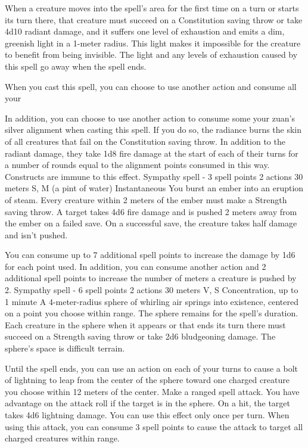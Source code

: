     When a creature moves into the spell's area for the first time on a turn or starts its turn there, that creature must succeed on a Constitution saving throw or take 4d10 radiant damage, and it suffers one level of exhaustion and emits a dim, greenish light in a 1-meter radius.
    This light makes it impossible for the creature to benefit from being invisible.
    The light and any levels of exhaustion caused by this spell go away when the spell ends.

    When you cast this spell, you can choose to use another action and consume all your

    In addition, you can choose to use another action to consume some your zuan's silver alignment when casting this spell.
    If you do so, the radiance burns the skin of all creatures that fail on the Constitution saving throw.
    In addition to the radiant damage, they take 1d8 fire damage at the start of each of their turns for a number of rounds equal to the alignment points consumed in this way.
    Constructs are immune to this effect.
    {Sympathy spell - 3 spell points}
    {2 actions}
    {30 meters}
    {S, M (a pint of water)}
    {Instantaneous}
    You burst an ember into an eruption of steam.
    Every creature within 2 meters of the ember must make a Strength saving throw.
    A target takes 4d6 fire damage and is pushed 2 meters away from the ember on a failed save.
    On a successful save, the creature takes half damage and isn't pushed.

    You can consume up to 7 additional spell points to increase the damage by 1d6 for each point used.
    In addition, you can consume another action and 2 additional spell points to increase the number of meters a creature is pushed by 2.
    {Sympathy spell - 6 spell points}
    {2 actions}
    {30 meters}
    {V, S}
    {Concentration, up to 1 minute}
    A 4-meter-radius sphere of whirling air springs into existence, centered on a point you choose within range.
    The sphere remains for the spell's duration.
    Each creature in the sphere when it appears or that ends its turn there must succeed on a Strength saving throw or take 2d6 bludgeoning damage.
    The sphere's space is difficult terrain.

    Until the spell ends, you can use an action on each of your turns to cause a bolt of lightning to leap from the center of the sphere toward one charged creature you choose within 12 meters of the center.
    Make a ranged spell attack.
    You have advantage on the attack roll if the target is in the sphere.
    On a hit, the target takes 4d6 lightning damage.
    You can use this effect only once per turn.
    When using this attack, you can consume 3 spell points to cause the attack to target all charged creatures within range.

